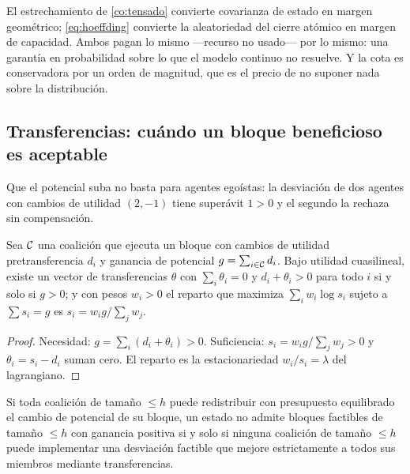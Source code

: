 \begin{observacion}
\label{obs:hoeffding-uso}
El estrechamiento de \cref{co:tensado} convierte covarianza de estado en
margen geométrico; \eqref{eq:hoeffding} convierte la aleatoriedad del cierre
atómico en margen de capacidad. Ambos pagan lo mismo —recurso no usado— por
lo mismo: una garantía en probabilidad sobre lo que el modelo continuo no
resuelve. Y la cota es conservadora por un orden de magnitud, que es el precio
de no suponer nada sobre la distribución.
\end{observacion}

\subsection{Transferencias: cuándo un bloque beneficioso es aceptable}

Que el potencial suba no basta para agentes egoístas: la desviación de dos
agentes con cambios de utilidad $(2,-1)$ tiene superávit $1>0$ y el segundo la
rechaza sin compensación.

\begin{proposicion}
\label{pr:implementabilidad-tu}
Sea $\mathcal{C}$ una coalición que ejecuta un bloque con cambios de utilidad
pretransferencia $d_i$ y ganancia de potencial $g=\sum_{i\in\mathcal{C}}d_i$. Bajo
utilidad cuasilineal, existe un vector de transferencias $\theta$ con
$\sum_i\theta_i=0$ y $d_i+\theta_i>0$ para todo $i$ si y solo si $g>0$; y
con pesos $w_i>0$ el reparto que maximiza $\sum_iw_i\log s_i$ sujeto a
$\sum s_i=g$ es $s_i=w_ig/\sum_jw_j$.
\end{proposicion}

\begin{proof}
Necesidad: $g=\sum_i(d_i+\theta_i)>0$. Suficiencia: $s_i=w_ig/\sum_jw_j>0$
y $\theta_i=s_i-d_i$ suman cero. El reparto es la estacionariedad
$w_i/s_i=\lambda$ del lagrangiano.
\end{proof}

\begin{corolario}
\label{co:fuerte-tu}
Si toda coalición de tamaño $\le h$ puede redistribuir con presupuesto
equilibrado el cambio de potencial de su bloque, un estado no admite bloques
factibles de tamaño $\le h$ con ganancia positiva si y solo si ninguna
coalición de tamaño $\le h$ puede implementar una desviación factible que
mejore estrictamente a todos sus miembros mediante transferencias.
\end{corolario}

